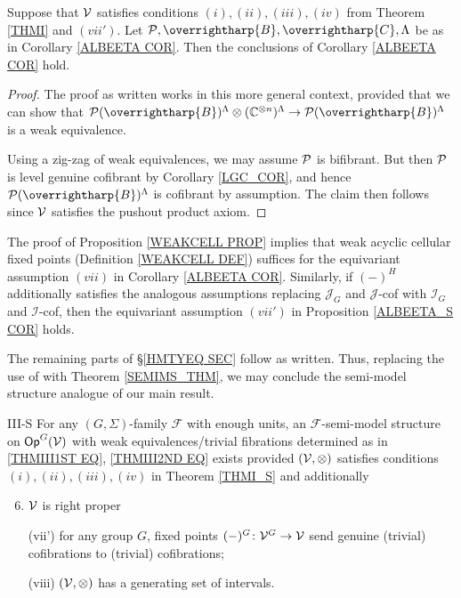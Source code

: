\documentclass[a4paper,10pt
]{article}%
\renewcommand{\F}{\mathcal F}
\renewcommand{\1}{\eta}%
\newcommand{\vect}[1]{\text{\overrightharp{\ensuremath{#1}}}}
\begin{document}
\begin{proposition}
      \label{ALBEETA_S COR}
      Suppose that $\V$ satisfies conditions $(i),(ii),(iii),(iv)$ from Theorem \ref{THMI} and $(vii')$.
      Let $\P, \vect B, \vect C, \Lambda$ be as in Corollary \ref{ALBEETA COR}.
      Then the conclusions of Corollary \ref{ALBEETA COR} hold.
\end{proposition}
\begin{proof}
      The proof as written works in this more general context, provided that we can show that
      $\P(\vect B)^{\Lambda} \otimes (\mathbb C^{\otimes n})^\Lambda \to \P(\vect B)^{\Lambda}$
      is a weak equivalence.
      
      Using a zig-zag of weak equivalences, we may assume $\P$ is bifibrant.
      But then $\P$ is level genuine cofibrant by Corollary \ref{LGC_COR},
      and hence $\P(\vect B)^\Lambda$ is cofibrant by assumption.
      The claim then follows since $\V$ satisfies the pushout product axiom.
\end{proof}

\begin{remark}
      The proof of Proposition \ref{WEAKCELL PROP} implies that
      weak acyclic cellular fixed points (Definition \ref{WEAKCELL DEF})
      suffices for the equivariant assumption $(vii)$ in Corollary \ref{ALBEETA COR}.
      Similarly, if $(-)^H$ additionally satisfies the analogous assumptions
      replacing $\mathcal J_G$ and $\mathcal J$-cof with $\mathcal I_G$ and $\mathcal I$-cof,
      then the equivariant assumption $(vii')$ in Proposition \ref{ALBEETA_S COR} holds.      
\end{remark}

The remaining parts of \S \ref{HMTYEQ SEC} follow as written.
Thus, replacing the use of \cite[Thm. 2.1.19]{Hov99} with Theorem \ref{SEMIMS_THM},
we may conclude the semi-model structure analogue of our main result.

\begin{customthm}{III-S}
      \label{THMIII_S}
      For any $(G,\Sigma)$-family $\F$ with enough units,
      an $\F$-semi-model structure on $\Op^G(\V)$ with weak equivalences/trivial fibrations determined as in
      \eqref{THMIII1ST EQ}, \eqref{THMIII2ND EQ} exists provided
      $(\V, \otimes)$ satisfies conditions $(i),(ii),(iii),(iv)$ in Theorem \ref{THMI_S} and additionally
      \begin{enumerate}[label = (\roman*)]
            \setcounter{enumi}{5}
      \item $\V$ is right proper
      \item[(vii')] for any group $G$, fixed points $(-)^G \colon \V^G \to \V$ send genuine (trivial) cofibrations to (trivial) cofibrations;
      \item[(viii)] $(\V, \otimes)$ has a generating set of intervals.
      \end{enumerate}
\end{customthm}








{}

\end{document}
